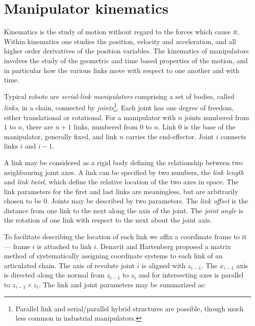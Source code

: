 \documentclass{article}
\newcommand{\DEF}[1]{{\it#1}}
\begin{document}
\newpage
{}
\vskip 4mm
\vskip 2mm
\moveleft 1.25in\vbox{}
\setcounter{section}{2}
\vskip 5mm

\section{Manipulator kinematics}  \label{sec:robot-kine}
Kinematics is the study of motion without regard to the forces which cause
it.  Within kinematics one studies the position, velocity and acceleration,
and all higher order derivatives of the position variables.
The kinematics of manipulators involves the study of the geometric
and time based properties of the motion, and in particular how the various
links move with respect to one another and with time.

Typical robots are \DEF{serial-link manipulators} comprising a set of bodies, called \DEF{links},
in a chain, connected by \DEF{joints}\footnote{Parallel link and serial/parallel hybrid structures 
are possible, though much less common in industrial manipulators.}.
Each joint has one degree of freedom,
either translational or rotational.  For a manipulator with $n$ joints
numbered from $1$ to $n$,
there are $n+1$ links, numbered from $0$ to $n$.  Link $0$ is the 
base of the manipulator, generally fixed, and link $n$ carries the end-effector.
Joint $i$ connects links $i$ and $i-1$.


A link may be considered as a rigid body defining the relationship between
two neighbouring joint axes.  A link can be specified by two numbers, the
{\em link length} and {\em link twist}, which define the relative location
of the two axes in space.  The link parameters for the first and last
links are meaningless, but are arbitrarily chosen to be 0.
Joints may be described by two parameters.  The {\em link offset}
is the distance from one link to the next along the axis of the joint.
The {\em joint angle} is the rotation of one link with respect to the
next about the joint axis.

To facilitate describing the location of each link we affix a coordinate
frame to it --- frame $i$ is attached to link $i$.
Denavit and Hartenberg\cite{Hartenberg55} proposed a
matrix method
of systematically assigning coordinate systems to each link of an
articulated chain.
The axis of revolute joint $i$ is aligned with $z_{i-1}$.
The  $x_{i-1}$ axis is directed along the normal from $z_{i-1}$ to
$z_i$ and for intersecting axes is parallel to $z_{i-1} \times z_i$.
The link and joint parameters may be summarized as:
\end{document}
